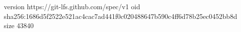 version https://git-lfs.github.com/spec/v1
oid sha256:1686d5f2522e521ac4cac7ad441f0c020488647b590c4ff6d78b25ec0452bb8d
size 43840
